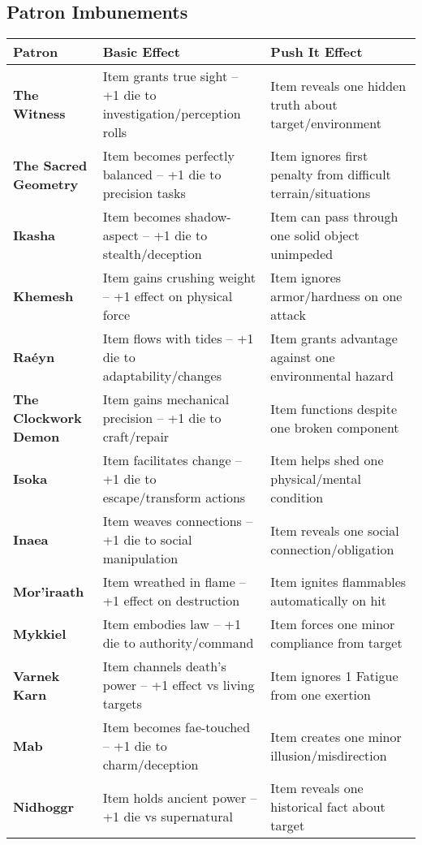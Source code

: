 \documentclass[12pt,twoside]{book}
\begin{document}
\subsection*{Patron Imbunements}

\begin{table}[htbp]
\centering
\begin{tabular}{>{\bfseries}l >{\raggedright\arraybackslash}p{5cm} >{\raggedright\arraybackslash}p{5cm}}
\toprule
\textbf{Patron} & \textbf{Basic Effect} & \textbf{Push It Effect} \\
\midrule
The Witness & Item grants true sight -- +1 die to investigation/perception rolls & Item reveals one hidden truth about target/environment \\
The Sacred Geometry & Item becomes perfectly balanced -- +1 die to precision tasks & Item ignores first penalty from difficult terrain/situations \\
Ikasha & Item becomes shadow-aspect -- +1 die to stealth/deception & Item can pass through one solid object unimpeded \\
Khemesh & Item gains crushing weight -- +1 effect on physical force & Item ignores armor/hardness on one attack \\
Raéyn & Item flows with tides -- +1 die to adaptability/changes & Item grants advantage against one environmental hazard \\
The Clockwork Demon & Item gains mechanical precision -- +1 die to craft/repair & Item functions despite one broken component \\
Isoka & Item facilitates change -- +1 die to escape/transform actions & Item helps shed one physical/mental condition \\
Inaea & Item weaves connections -- +1 die to social manipulation & Item reveals one social connection/obligation \\
Mor'iraath & Item wreathed in flame -- +1 effect on destruction & Item ignites flammables automatically on hit \\
Mykkiel & Item embodies law -- +1 die to authority/command & Item forces one minor compliance from target \\
Varnek Karn & Item channels death's power -- +1 effect vs living targets & Item ignores 1 Fatigue from one exertion \\
Mab & Item becomes fae-touched -- +1 die to charm/deception & Item creates one minor illusion/misdirection \\
Nidhoggr & Item holds ancient power -- +1 die vs supernatural & Item reveals one historical fact about target \\

\end{tabular}
\end{table}
\end{document}

